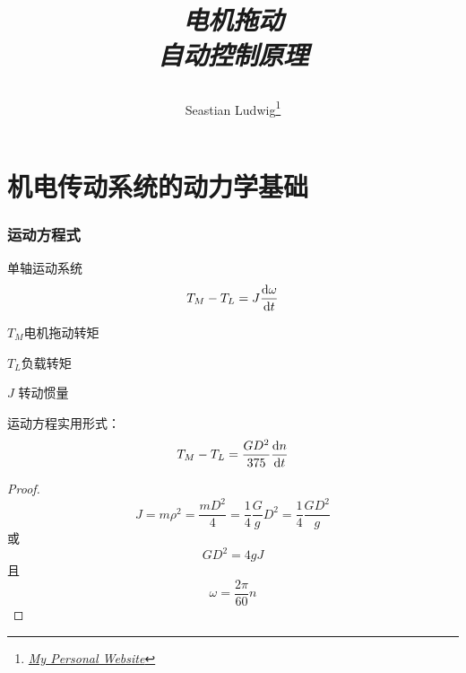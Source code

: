 \documentclass[10pt]{ctexart}
\title{\begin{center}{\Huge \textit{电机拖动}}\\{{\itshape 自动控制原理}}\end{center}}
\author{Seastian Ludwig\footnote{\href{https://geodesick.com/}{\textit{My Personal Website}}}}
\affiliation{
   University of Northeast Electronic Power University\\
Electronic Engineer school\\
}
\begin{document}
\maketitle
\flushbottom
\newpage
\pagestyle{fancynotes}

\part{机电传动系统的动力学基础}
\section{运动方程式}
单轴运动系统
\begin{equation}
    T_M -T_{L} =J\frac{{\rm d} \omega}{{\rm d}t}
\end{equation}

$ T_{M}  $电机拖动转矩

$ T_{L}  $负载转矩

$ J $ 转动惯量 

\begin{definition}
    运动方程实用形式：
    \begin{equation}
    T_{M}-T_{L}=\frac{GD^{2} }{375}\frac{{\rm d}n}{{\rm d} t}  
    \end{equation}
\end{definition}
\begin{proof}
    $$	J=m\rho^{2}=\frac{mD^{2} }{4}=\frac{1}{4}\frac{G}{g}D^{2} =\frac{1}{4}\frac{GD^{2}}{g} $$ 
    或
    $$	GD^{2} =4gJ$$
    且
    $$	\omega=\frac{2\pi}{60} n$$ 
\end{proof}
\end{document}
